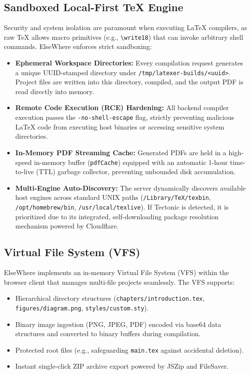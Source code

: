 \documentclass[12pt,a4paper]{article}
\newcommand{\code}[1]{\texttt{#1}}
\begin{document}
\subsection{Sandboxed Local-First TeX Engine}
Security and system isolation are paramount when executing \LaTeX{} compilers, as raw \TeX{} allows macro primitives (e.g., \code{\textbackslash write18}) that can invoke arbitrary shell commands. ElseWhere enforces strict sandboxing:
\begin{itemize}
    \item \textbf{Ephemeral Workspace Directories:} Every compilation request generates a unique UUID-stamped directory under \code{/tmp/latexer-builds/<uuid>}. Project files are written into this directory, compiled, and the output PDF is read directly into memory.
    \item \textbf{Remote Code Execution (RCE) Hardening:} All backend compiler execution passes the \code{-no-shell-escape} flag, strictly preventing malicious \LaTeX{} code from executing host binaries or accessing sensitive system directories.
    \item \textbf{In-Memory PDF Streaming Cache:} Generated PDFs are held in a high-speed in-memory buffer (\code{pdfCache}) equipped with an automatic 1-hour time-to-live (TTL) garbage collector, preventing unbounded disk accumulation.
    \item \textbf{Multi-Engine Auto-Discovery:} The server dynamically discovers available host engines across standard UNIX paths (\code{/Library/TeX/texbin}, \code{/opt/homebrew/bin}, \code{/usr/local/texlive}). If Tectonic is detected, it is prioritized due to its integrated, self-downloading package resolution mechanism powered by Cloudflare.
\end{itemize}

\subsection{Virtual File System (VFS)}
ElseWhere implements an in-memory Virtual File System (VFS) within the browser client that manages multi-file projects seamlessly. The VFS supports:
\begin{itemize}
    \item Hierarchical directory structures (\code{chapters/\allowbreak introduction.tex}, \code{figures/\allowbreak diagram.png}, \code{styles/\allowbreak custom.sty}).
    \item Binary image ingestion (PNG, JPEG, PDF) encoded via base64 data structures and converted to binary buffers during compilation.
    \item Protected root files (e.g., safeguarding \code{main.tex} against accidental deletion).
    \item Instant single-click ZIP archive export powered by JSZip and FileSaver.
\end{itemize}
\end{document}
